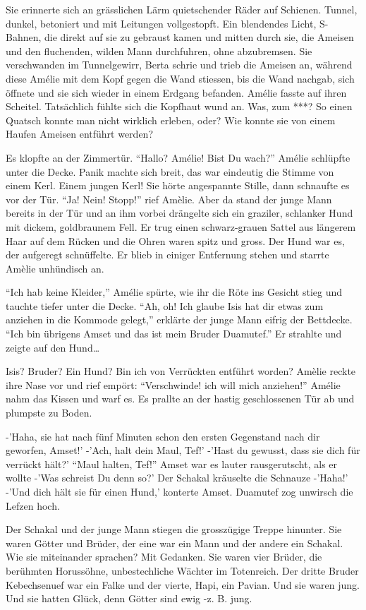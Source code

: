 \documentclass[11pt,titlepage,a5paper]{book}
\begin{document}
 Sie erinnerte sich an grässlichen Lärm quietschender Räder auf Schienen. Tunnel, dunkel, betoniert und mit Leitungen vollgestopft. Ein blendendes Licht, S-Bahnen, die direkt auf sie zu gebraust kamen und mitten durch sie, die Ameisen und den fluchenden, wilden Mann durchfuhren, ohne abzubremsen. Sie verschwanden im Tunnelgewirr, Berta schrie und trieb die Ameisen an, während diese Amélie mit dem Kopf gegen die Wand stiessen, bis die Wand nachgab, sich öffnete und sie sich wieder in einem Erdgang befanden. Amélie fasste auf ihren Scheitel. Tatsächlich fühlte sich die Kopfhaut wund an. Was, zum ***? So einen Quatsch konnte man nicht wirklich erleben, oder? Wie konnte sie von einem Haufen Ameisen entführt werden? 

Es klopfte an der Zimmertür.
"`Hallo? Amélie! Bist Du wach?"' Amélie schlüpfte unter die Decke. Panik machte sich breit, das war eindeutig die Stimme von einem Kerl. Einem jungen Kerl! Sie hörte angespannte Stille, dann schnaufte es vor der Tür. "`Ja! Nein! Stopp!"' rief Amèlie. Aber da stand der junge Mann bereits in der Tür und an ihm vorbei drängelte sich ein graziler, schlanker Hund mit dickem, goldbraunem Fell. Er trug einen schwarz-grauen Sattel aus längerem Haar auf dem Rücken und die Ohren waren spitz und gross. Der Hund war es, der aufgeregt schnüffelte. Er blieb in einiger Entfernung stehen und starrte Amèlie unhündisch an.

"`Ich hab keine Kleider,"' Amélie spürte, wie ihr die Röte ins Gesicht stieg und tauchte tiefer unter die Decke. "`Ah, oh! Ich glaube Isis hat dir etwas zum anziehen in die Kommode gelegt,"' erklärte der junge Mann eifrig der Bettdecke. "`Ich bin übrigens Amset und das ist mein Bruder Duamutef."' Er strahlte und zeigte auf den Hund\dots

Isis? Bruder? Ein Hund? Bin ich von Verrückten entführt worden? Amèlie reckte ihre Nase vor und rief empört: "`Verschwinde! ich will mich anziehen!"' Amélie nahm das Kissen und warf es. Es prallte an der hastig geschlossenen Tür ab und plumpste zu Boden.

-'Haha, sie hat nach fünf Minuten schon den ersten Gegenstand nach dir geworfen, Amset!' -'Ach, halt dein Maul, Tef!' -'Hast du gewusst, dass sie dich für verrückt hält?' "`Maul halten, Tef!"' Amset war es lauter rausgerutscht, als er wollte -'Was schreist Du denn so?' Der Schakal kräuselte die Schnauze -'Haha!' -'Und dich hält sie für einen Hund,' konterte Amset. Duamutef zog unwirsch die Lefzen hoch.

Der Schakal und der junge Mann stiegen die grosszügige Treppe hinunter. Sie waren Götter und Brüder, der eine war ein Mann und der andere ein Schakal. Wie sie miteinander sprachen? Mit Gedanken. Sie waren vier Brüder, die berühmten Horussöhne, unbestechliche Wächter im Totenreich. Der dritte Bruder Kebechsenuef war ein Falke und der vierte, Hapi, ein Pavian. Und sie waren jung. Und sie hatten Glück, denn Götter sind ewig -z. B. jung.
\end{document}
